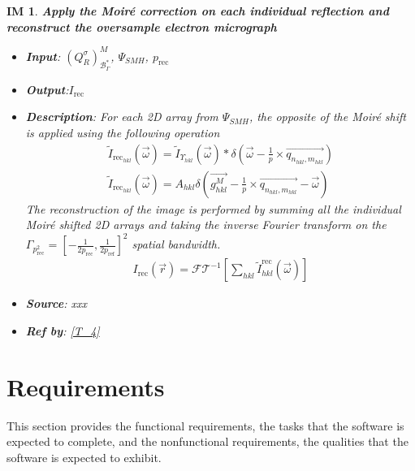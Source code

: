 \documentclass[12pt]{article}
\newtheorem{IM}{IM}
\begin{document}
\begin{IM}
\label{IM_5}
\noindent\colorbox{shadecolorIM}{\normalfont \textbf{Apply the Moir{\'e} correction on each individual reflection and reconstruct the oversample electron micrograph}}
\normalfont
\begin{itemize}
\item \textbf{Input}: $(Q^{\sigma}_{R})^{M}_{\mathcal{B}_{\Gamma}^{*}}$, $\Psi_{SMH}$, $p_{\text{rec}}$
\item \textbf{Output}:$I_{\text{rec}}$
\item \textbf{Description}: For each 2D array from $\Psi_{SMH}$, the opposite of the Moir{\'e} shift is applied using the following operation
\begin{equation}
\begin{gathered}
\tilde{I}_{\text{rec}_{hkl}}(\vec{\omega}) = \tilde{I}_{\Upsilon_{hkl}}(\vec{\omega}) \ast \delta(\overrightarrow{\omega} - \frac{1}{p} \times \overrightarrow{q_{n_{hkl},m_{hkl}}}) \\
\tilde{I}_{\text{rec}_{hkl}}(\vec{\omega}) = A_{hkl}\delta(\overrightarrow{g_{hkl}^{M}} - \frac{1}{p} \times \overrightarrow{q_{n_{hkl},m_{hkl}}} -\overrightarrow{\omega})
\end{gathered}
\end{equation}
The reconstruction of the image is performed by summing all the individual Moir{\'e} shifted 2D arrays and taking the inverse Fourier transform on the $\Gamma_{p_\text{rec}^{2}}= [-\frac{1}{2p_\text{rec}}, \frac{1}{2p_\text{ref}}]^{2}$ spatial bandwidth.
\begin{equation}
\begin{gathered}
I_{\text{rec}}(\vec{r}) = \mathcal{FT}^{-1}[\sum_{hkl} \tilde{I}_{hkl}^{\text{rec}}(\vec{\omega})]
\end{gathered}
\end{equation}
\item \textbf{Source}: xxx
\item \textbf{Ref by}: \cref{T_4}
\end{itemize}
\end{IM}

\section{Requirements}

This section provides the functional requirements, the tasks that the software 
is expected to complete, and the nonfunctional requirements, the qualities that 
the software is expected to exhibit.
\end{document}
